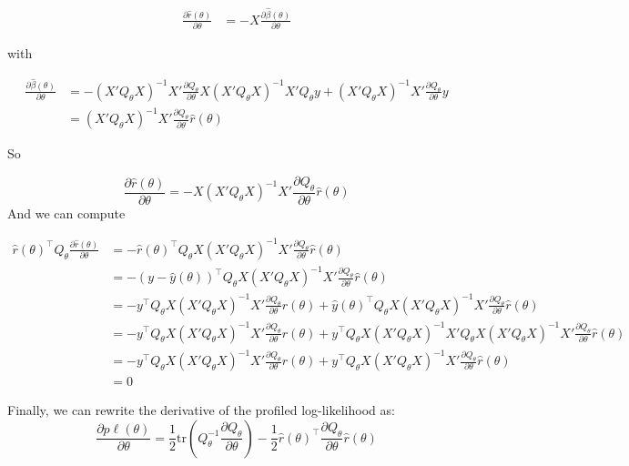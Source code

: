 \documentclass{article}
\begin{document}
\begin{align}
\frac{\partial \hat r(\theta)}{\partial \theta} &= -X\frac{\partial \hat\beta(\theta)}{\partial \theta} 
\end{align}

with 

\begin{align}
  \frac{\partial \hat \beta(\theta)}{\partial \theta} &= -(X'Q_\theta X)^{-1}X'\frac{\partial Q_\theta}{\partial \theta}X (X'Q_\theta X)^{-1} X'Q_\theta y + (X'Q_\theta X)^{-1}X' \frac{\partial Q_\theta}{\partial \theta}y\\
&=(X'Q_\theta X)^{-1}X'\frac{\partial Q_\theta}{\partial \theta} \hat r(\theta)
\end{align}

So 

\[\frac{\partial \hat r(\theta)}{\partial \theta} = -X(X'Q_\theta X)^{-1}X'\frac{\partial Q_\theta}{\partial \theta} \hat r(\theta)\]
And we can compute

\begin{align*}
  \hat r(\theta)^\top Q_\theta \frac{\partial \hat r(\theta)}{\partial \theta} &= - \hat r(\theta)^\top Q_\theta X(X'Q_\theta X)^{-1}X'\frac{\partial Q_\theta}{\partial \theta} \hat r(\theta)\\
&= - (y-\hat y(\theta))^\top Q_\theta X(X'Q_\theta X)^{-1}X'\frac{\partial Q_\theta}{\partial \theta} \hat r(\theta)\\
&= - y^\top Q_\theta X(X'Q_\theta X)^{-1}X'\frac{\partial Q_\theta}{\partial \theta} \hat r(\theta)+ \hat y(\theta)^\top Q_\theta X(X'Q_\theta X)^{-1}X'\frac{\partial Q_\theta}{\partial \theta} \hat r(\theta)\\
&= - y^\top Q_\theta X(X'Q_\theta X)^{-1}X'\frac{\partial Q_\theta}{\partial \theta} \hat r(\theta) + y^\top Q_\theta X(X'Q_\theta X)^{-1}X' Q_\theta X(X'Q_\theta X)^{-1}X'\frac{\partial Q_\theta}{\partial \theta} \hat r(\theta)\\
&=  - y^\top Q_\theta X(X'Q_\theta X)^{-1}X'\frac{\partial Q_\theta}{\partial \theta} \hat r(\theta)+ y^\top Q_\theta X(X'Q_\theta X)^{-1}X'\frac{\partial Q_\theta}{\partial \theta} \hat r(\theta)\\
&= 0
\end{align*}



Finally, we can rewrite the derivative of the profiled log-likelihood as:
\[\frac{\partial p\ell(\theta)}{\partial \theta} = \frac{1}{2} \mathrm{tr}\left(Q_\theta^{-1} \frac{\partial Q_\theta}{\partial \theta}\right) 
 -  \frac{1}{2}\hat r(\theta)^\top  \frac{\partial Q_\theta}{\partial \theta} \hat r(\theta) \]
\end{document}
